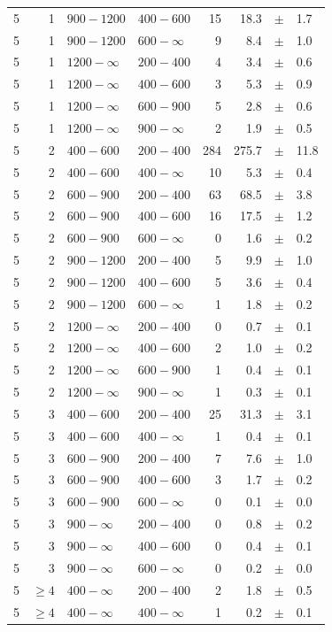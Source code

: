 \begin{table}[!h]
\begin{tabular}{rrllrrcl}
5 & 1 & $ 900-1200$ & $400-600$ &     15 &     18.3 &$\pm$&    1.7 \\
5 & 1 & $ 900-1200$ & $600-\infty$ &      9 &      8.4 &$\pm$&    1.0 \\
5\T & 1 & $1200- \infty$ & $200-400$ &      4 &      3.4 &$\pm$&    0.6 \\
5 & 1 & $1200- \infty$ & $400-600$ &      3 &      5.3 &$\pm$&    0.9 \\
5 & 1 & $1200- \infty$ & $600-900$ &      5 &      2.8 &$\pm$&    0.6 \\
5 & 1 & $1200- \infty$ & $900-\infty$ &      2 &      1.9 &$\pm$&    0.5 \\
5\T & 2 & $ 400- 600$ & $200-400$ &    284 &    275.7 &$\pm$&   11.8 \\
5 & 2 & $ 400- 600$ & $400-\infty$ &     10 &      5.3 &$\pm$&    0.4 \\
5\T & 2 & $ 600- 900$ & $200-400$ &     63 &     68.5 &$\pm$&    3.8 \\
5 & 2 & $ 600- 900$ & $400-600$ &     16 &     17.5 &$\pm$&    1.2 \\
5 & 2 & $ 600- 900$ & $600-\infty$ &      0 &      1.6 &$\pm$&    0.2 \\
5\T & 2 & $ 900-1200$ & $200-400$ &      5 &      9.9 &$\pm$&    1.0 \\
5 & 2 & $ 900-1200$ & $400-600$ &      5 &      3.6 &$\pm$&    0.4 \\
5 & 2 & $ 900-1200$ & $600-\infty$ &      1 &      1.8 &$\pm$&    0.2 \\
5\T & 2 & $1200- \infty$ & $200-400$ &      0 &      0.7 &$\pm$&    0.1 \\
5 & 2 & $1200- \infty$ & $400-600$ &      2 &      1.0 &$\pm$&    0.2 \\
5 & 2 & $1200- \infty$ & $600-900$ &      1 &      0.4 &$\pm$&    0.1 \\
5 & 2 & $1200- \infty$ & $900-\infty$ &      1 &      0.3 &$\pm$&    0.1 \\
5\T & 3 & $ 400- 600$ & $200-400$ &     25 &     31.3 &$\pm$&    3.1 \\
5 & 3 & $ 400- 600$ & $400-\infty$ &      1 &      0.4 &$\pm$&    0.1 \\
5\T & 3 & $ 600- 900$ & $200-400$ &      7 &      7.6 &$\pm$&    1.0 \\
5 & 3 & $ 600- 900$ & $400-600$ &      3 &      1.7 &$\pm$&    0.2 \\
5 & 3 & $ 600- 900$ & $600-\infty$ &      0 &      0.1 &$\pm$&    0.0 \\
5\T & 3 & $ 900- \infty$ & $200-400$ &      0 &      0.8 &$\pm$&    0.2 \\
5 & 3 & $ 900- \infty$ & $400-600$ &      0 &      0.4 &$\pm$&    0.1 \\
5 & 3 & $ 900- \infty$ & $600-\infty$ &      0 &      0.2 &$\pm$&    0.0 \\
5\T & $\geq 4$ & $ 400- \infty$ & $200-400$ &      2 &      1.8 &$\pm$&    0.5 \\
5 & $\geq 4$ & $ 400- \infty$ & $400-\infty$ &      1 &      0.2 &$\pm$&    0.1 \\
    \hline
  \end{tabular}
\end{table}

